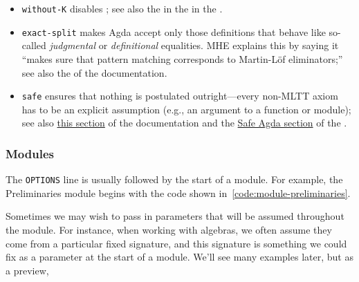 \begin{itemize}
\item
  \texttt{without-K} disables \axiomk; see also the in the \agdarefk in the \agdaref.
\item
  \texttt{exact-split} makes Agda accept only those definitions that
  behave like so-called \emph{judgmental} or \emph{definitional}
  equalities. MHE explains this by saying it ``makes sure that pattern
  matching corresponds to Martin-Löf eliminators;'' see also the
  \patternmatching of the \agdatools documentation.
\item
  \texttt{safe} ensures that nothing is postulated outright---every non-MLTT axiom has to be an explicit assumption (e.g., an argument to a function or module); see also \href{https://agda.readthedocs.io/en/v2.6.1/tools/command-line-options.html\#cmdoption-safe}{this section} of the \agdatools documentation and the \href{https://agda.readthedocs.io/en/v2.6.1/language/safe-agda.html\#safe-agda}{Safe Agda section} of the \agdaref.
\end{itemize}


\subsubsection{Modules}\label{modules}

The \texttt{OPTIONS} line is usually followed by the start of a module.
For example, the Preliminaries module begins with the code shown in~\ref{code:module-preliminaries}.
\ccpad
\begin{code}[number=code:module-preliminaries]
\>[0]\AgdaSpace{}%
\AgdaSpace{}%
\<%
\end{code}
\ccpad

Sometimes we may wish to pass in parameters that will be assumed throughout the module. For instance, when working with algebras, we often assume they come from a particular fixed signature, and this signature is something we could fix as a parameter at the start of a module. We'll see many examples later, but as a preview,

